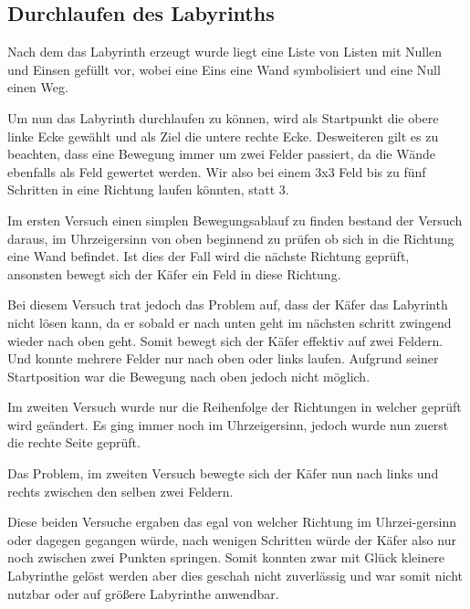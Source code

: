 \documentclass[12pt, a4paper, titlepage]{article}
\begin{document}
\subsection{Durchlaufen des Labyrinths}

Nach dem das Labyrinth erzeugt wurde liegt eine Liste von Listen mit Nullen und Einsen gefüllt vor, wobei eine Eins eine Wand symbolisiert und eine Null einen Weg.


\bigskip

Um nun das Labyrinth durchlaufen zu können, wird als Startpunkt die obere linke Ecke gewählt und als Ziel die untere rechte Ecke. Desweiteren gilt es zu beachten, dass eine Bewegung immer um zwei Felder passiert, da die Wände ebenfalls als Feld gewertet werden.
Wir also bei einem 3x3 Feld bis zu fünf Schritten in eine Richtung laufen könnten, statt 3.

\bigskip

Im ersten Versuch einen simplen Bewegungsablauf zu finden bestand der Versuch daraus, im Uhrzeigersinn von oben beginnend zu prüfen ob sich in die Richtung eine Wand befindet.
Ist dies der Fall wird die nächste Richtung geprüft, ansonsten bewegt sich der Käfer ein Feld in diese Richtung.


Bei diesem Versuch trat jedoch das Problem auf, dass der Käfer das Labyrinth nicht lösen kann, da er sobald er nach unten geht im nächsten schritt zwingend wieder nach oben geht.
Somit bewegt sich der Käfer effektiv auf zwei Feldern.
Und konnte mehrere Felder nur nach oben oder links laufen.
Aufgrund seiner Startposition war die Bewegung nach oben jedoch nicht möglich.

\bigskip

Im zweiten Versuch wurde nur die Reihenfolge der Richtungen in welcher geprüft wird geändert.
Es ging immer noch im Uhrzeigersinn, jedoch wurde nun zuerst die rechte Seite geprüft.

Das Problem, im zweiten Versuch bewegte sich der Käfer nun nach links und rechts zwischen den selben zwei Feldern.


\bigskip

Diese beiden Versuche ergaben das egal von welcher Richtung im Uhrzei-gersinn oder dagegen gegangen würde, nach wenigen Schritten würde der Käfer also nur noch zwischen zwei Punkten springen.
Somit konnten zwar mit Glück kleinere Labyrinthe gelöst werden aber dies geschah nicht zuverlässig und war somit nicht nutzbar oder auf größere Labyrinthe anwendbar.

\bigskip
\end{document}
